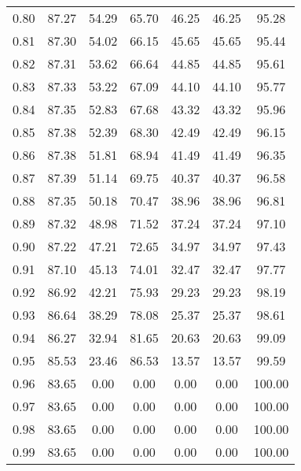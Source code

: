 \begin{tabular}{|c|c|c|c|c|c|c|}
      0.80 &     87.27 &     54.29 &      65.70 &   46.25 &      46.25 &         95.28 \\
      0.81 &     87.30 &     54.02 &      66.15 &   45.65 &      45.65 &         95.44 \\
      0.82 &     87.31 &     53.62 &      66.64 &   44.85 &      44.85 &         95.61 \\
      0.83 &     87.33 &     53.22 &      67.09 &   44.10 &      44.10 &         95.77 \\
      0.84 &     87.35 &     52.83 &      67.68 &   43.32 &      43.32 &         95.96 \\
      0.85 &     87.38 &     52.39 &      68.30 &   42.49 &      42.49 &         96.15 \\
      0.86 &     87.38 &     51.81 &      68.94 &   41.49 &      41.49 &         96.35 \\
      0.87 &     87.39 &     51.14 &      69.75 &   40.37 &      40.37 &         96.58 \\
      0.88 &     87.35 &     50.18 &      70.47 &   38.96 &      38.96 &         96.81 \\
      0.89 &     87.32 &     48.98 &      71.52 &   37.24 &      37.24 &         97.10 \\
      0.90 &     87.22 &     47.21 &      72.65 &   34.97 &      34.97 &         97.43 \\
      0.91 &     87.10 &     45.13 &      74.01 &   32.47 &      32.47 &         97.77 \\
      0.92 &     86.92 &     42.21 &      75.93 &   29.23 &      29.23 &         98.19 \\
      0.93 &     86.64 &     38.29 &      78.08 &   25.37 &      25.37 &         98.61 \\
      0.94 &     86.27 &     32.94 &      81.65 &   20.63 &      20.63 &         99.09 \\
      0.95 &     85.53 &     23.46 &      86.53 &   13.57 &      13.57 &         99.59 \\
      0.96 &     83.65 &      0.00 &       0.00 &    0.00 &       0.00 &        100.00 \\
      0.97 &     83.65 &      0.00 &       0.00 &    0.00 &       0.00 &        100.00 \\
      0.98 &     83.65 &      0.00 &       0.00 &    0.00 &       0.00 &        100.00 \\
      0.99 &     83.65 &      0.00 &       0.00 &    0.00 &       0.00 &        100.00 \\
\bottomrule
\end{tabular}
